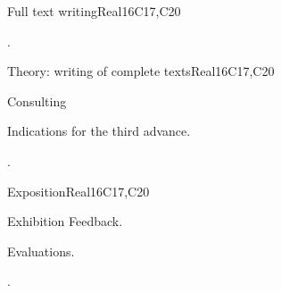 \begin{syllabus}
\begin{unit}{Full text writing}{}{Real}{16}{C17,C20}
  \begin{learningoutcomes}
   \item .%
  \end{learningoutcomes}
\end{unit}

\begin{unit}{Theory: writing of complete texts}{}{Real}{16}{C17,C20}
  \begin{topics}
      \item Consulting
      \item Indications for the third advance.
  \end{topics}

  \begin{learningoutcomes}
   \item .%
  \end{learningoutcomes}
\end{unit}

\begin{unit}{Exposition}{}{Real}{16}{C17,C20}
  \begin{topics}
      \item Exhibition Feedback.
      \item Evaluations.
  \end{topics}

  \begin{learningoutcomes}
   \item .%
  \end{learningoutcomes}
\end{unit}

\begin{coursebibliography}
\end{coursebibliography}

\end{syllabus}
